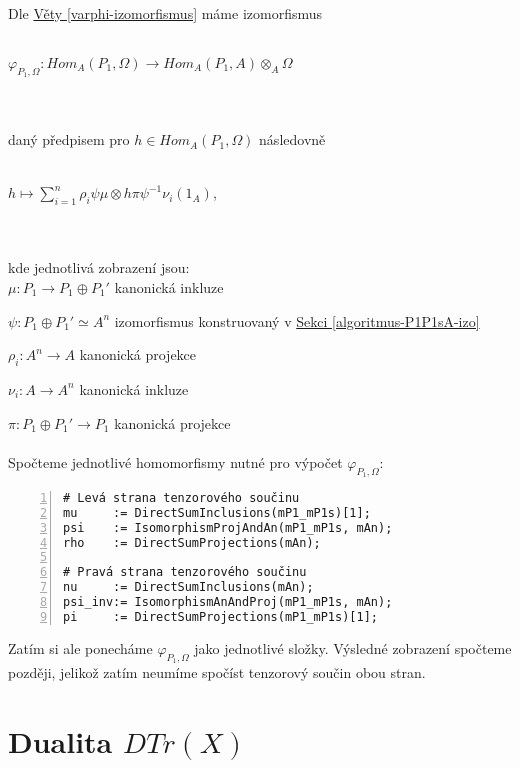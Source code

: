       \paragraph{ } Dle \hyperref[varphi-izomorfismus]{Věty \ref*{varphi-izomorfismus}} máme izomorfismus \\\\
      \centerline{$\varphi_{P_1,\Omega}:Hom_A(P_1,\Omega)\rightarrow Hom_A(P_1,A)\otimes_A \Omega$} 
      \\\\
      daný předpisem pro $h\in Hom_A(P_1,\Omega)$ následovně \\\\
       \centerline{$h\mapsto\sum_{i=1}^n \rho_i\psi\mu\otimes h\pi\psi^{-1}\nu_i(1_A)$,} 
       \\\\
       kde jednotlivá zobrazení jsou: \\
         
         $ \mu: P_1\rightarrow P_1\oplus P_1'$ \quad kanonická inkluze
         
         $ \psi: P_1\oplus P_1' \simeq A^n $ 
            \quad izomorfismus konstruovaný v 
            \hyperref[algoritmus-P1P1sA-izo]{Sekci \ref*{algoritmus-P1P1sA-izo}}
       
         $ \rho_i: A^n\rightarrow A $ \quad kanonická projekce
         
         $ \nu_i: A\rightarrow A^n $ \quad kanonická inkluze
         
         $ \pi: P_1\oplus P_1'\rightarrow P_1$ \quad kanonická projekce\\\\
      Spočteme jednotlivé homomorfismy nutné pro výpočet $\varphi_{P_1,\Omega}$:
      \begin{Verbatim}[frame=single,numbers=left]
# Levá strana tenzorového součinu
mu     := DirectSumInclusions(mP1_mP1s)[1];
psi    := IsomorphismProjAndAn(mP1_mP1s, mAn);
rho    := DirectSumProjections(mAn);

# Pravá strana tenzorového součinu
nu     := DirectSumInclusions(mAn);
psi_inv:= IsomorphismAnAndProj(mP1_mP1s, mAn);
pi     := DirectSumProjections(mP1_mP1s)[1];
      \end{Verbatim}      
      Zatím si ale ponecháme $\varphi_{P_1,\Omega}$ jako
      jednotlivé složky. Výsledné zobrazení spočteme později, jelikož zatím 
      neumíme spočíst tenzorový součin obou stran.

              
  \section{Dualita $DTr(X)$}\label{dualita-DTrX}
  
